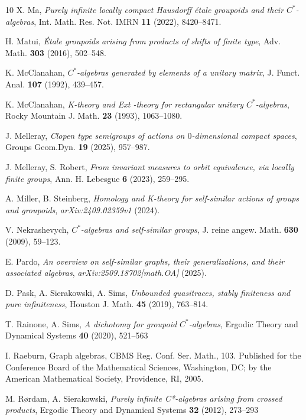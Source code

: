 \documentclass[11pt]{amsart}
\theoremstyle{plain}            %
\theoremstyle{definition}       %
\theoremstyle{definition}       %
\theoremstyle{remark}
\begin{document}
\begin{thebibliography}{10}
     X. Ma, \emph{Purely infinite locally compact Hausdorff étale groupoids and their $C^*$-algebras}, Int. Math. Res. Not.
     IMRN \textbf{11} (2022), 8420--8471.

    H. Matui, \emph{Étale groupoids arising from products of shifts of finite type}, Adv. Math. \textbf{303} (2016), 502--548.
    
	 K. McClanahan, \emph{$C^*$-algebras generated by elements of a unitary matrix}, J. Funct. Anal. \textbf{107} (1992), 439--457.
	
	 K. McClanahan, \emph{K-theory and  Ext -theory for rectangular unitary  $C^*$-algebras}, Rocky Mountain J. Math. \textbf{23} (1993),  1063--1080.
	
		 J. Melleray, \emph{Clopen type semigroups of actions on $0$-dimensional compact spaces}, Groups Geom.Dyn. \textbf{19} (2025),  957--987.

         J. Melleray, S. Robert, \emph{From invariant measures to orbit equivalence, via locally finite groups}, Ann. H. Lebesgue \textbf{6} (2023), 259--295.
    
	 A. Miller, B. Steinberg, \emph{Homology and K-theory for self-similar actions of groups and groupoids}, \emph{arXiv:2409.02359v1} (2024).
	
	 V. Nekrashevych, \emph{$C^*$-algebras and self-similar groups}, J. reine angew. Math. \textbf{630} (2009), 59--123.
	
    E. Pardo, \emph{An overview on self-similar graphs, their generalizations, and their associated algebras},	\emph{arXiv:2509.18702[math.OA]} (2025).
    
	 D. Pask, A. Sierakowski, A. Sims, \emph{Unbounded quasitraces, stably finiteness and pure infiniteness}, Houston J. Math. \textbf{45} (2019), 763--814.
	
	 T. Rainone, A. Sims, \emph{A dichotomy for groupoid $C^*$-algebras}, Ergodic Theory and Dynamical Systems  \textbf{40} (2020), 521--563
	
	 I. Raeburn, Graph algebras, CBMS Reg. Conf. Ser. Math., 103.
	Published for the Conference Board of the Mathematical Sciences, Washington, DC; by the American Mathematical Society, Providence, RI, 2005. 
	
	 M. R\o rdam, A. Sierakowski, \emph{Purely infinite
		C*-algebras arising from crossed products}, Ergodic Theory and
	Dynamical Systems {\bf 32} (2012), 273--293
	

\end{thebibliography}
\end{document}

